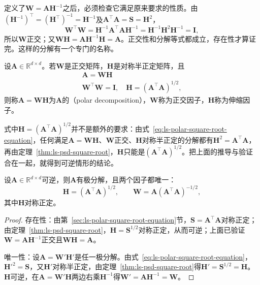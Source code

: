 定义了$\bm W=\bm A\bm H^{-1}$之后，必须检查它满足原来要求的性质。由$(\bm H^{-1})^\top=(\bm H^\top)^{-1}=\bm H^{-1}$及$\bm A^\top\bm A=\bm S=\bm H^2$，
\[
 \bm W^\top\bm W
 =\bm H^{-1}\bm A^\top\bm A\bm H^{-1}
 =\bm H^{-1}\bm H^2\bm H^{-1}
 =\bm I ,
\]
所以$\bm W$正交；又$\bm W\bm H=\bm A\bm H^{-1}\bm H=\bm A$。正交性和分解等式都成立，存在性才算证完。这样的分解有一个专门的名称。

\begin{definition}[极分解]
\label{def:matrix-analysis-polar-decomposition}
设$\bm A\in\mathbb R^{d\times d}$。若$\bm W$是正交矩阵，$\bm H$是对称半正定矩阵，且
\begin{equation}
\begin{gathered}
 \bm A=\bm W\bm H\\
 \bm W^\top\bm W=\bm I,\quad \bm H=(\bm A^\top\bm A)^{1/2},
\end{gathered}
\label{eq:matrix-analysis-polar-decomposition}
\end{equation}
则称$\bm A=\bm W\bm H$为$\bm A$的（polar decomposition），$\bm W$称为正交因子，$\bm H$称为伸缩因子。
\end{definition}

式中$\bm H=(\bm A^\top\bm A)^{1/2}$并不是额外的要求：由式~\eqref{eq:ls-polar-square-root-equation}，任何满足$\bm A=\bm W\bm H$、$\bm W$正交、$\bm H$对称半正定的分解都有$\bm H^2=\bm A^\top\bm A$，再由定理~\ref{thm:ls-psd-square-root}，$\bm H$只能是$(\bm A^\top\bm A)^{1/2}$。把上面的推导与验证合在一起，就得到可逆情形的结论。

\begin{theorem}[可逆矩阵的极分解]
\label{thm:ls-polar-invertible}
设$\bm A\in\mathbb R^{d\times d}$可逆，则$\bm A$有极分解，且两个因子都唯一：
\[
 \bm H=(\bm A^\top\bm A)^{1/2},\qquad
 \bm W=\bm A(\bm A^\top\bm A)^{-1/2},
\]
其中$\bm H$对称正定。
\end{theorem}
\begin{proof}
存在性：由第~\ref{sec:ls-polar-square-root-equation}节，$\bm S=\bm A^\top\bm A$对称正定；由定理~\ref{thm:ls-psd-square-root}，$\bm H=\bm S^{1/2}$对称正定，从而可逆；上面已验证$\bm W=\bm A\bm H^{-1}$正交且$\bm W\bm H=\bm A$。

唯一性：设$\bm A=\bm W'\bm H'$是任一极分解。由式~\eqref{eq:ls-polar-square-root-equation}，$\bm H'^2=\bm S$，又$\bm H'$对称半正定，由定理~\ref{thm:ls-psd-square-root}得$\bm H'=\bm S^{1/2}=\bm H$。$\bm H$可逆，在$\bm A=\bm W'\bm H$两边右乘$\bm H^{-1}$得$\bm W'=\bm A\bm H^{-1}=\bm W$。
\end{proof}

